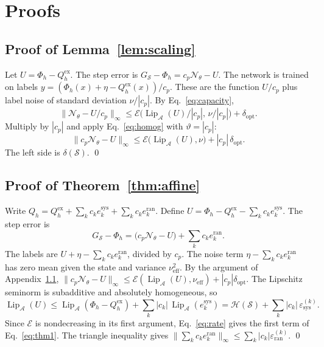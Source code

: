 \documentclass[11pt]{article}
\theoremstyle{definition}
\theoremstyle{remark}
\newcommand{\Aset}{\mathcal{A}}          %
\newcommand{\Net}{\mathcal{N}_\theta}    %
\newcommand{\Meth}{\mathcal{S}}          %
\newcommand{\Hard}{\mathcal{H}}          %
\newcommand{\Err}{\mathcal{E}}           %
\newcommand{\Lip}{\operatorname{Lip}_{\Aset}}
\newcommand{\supA}[1]{\|#1\|_{\infty}}
\newcommand{\sys}{\mathrm{sys}}
\newcommand{\ran}{\mathrm{ran}}
\newcommand{\ex}{\mathrm{ex}}
\begin{document}
\appendix
\section{Proofs}\label{app:proofs}

\subsection{Proof of Lemma~\ref{lem:scaling}}\label{app:scaling}
Let $U = \Phi_h - Q_h^\ex$.
The step error is $G_\Meth - \Phi_h = c_p\Net - U$.
The network is trained on labels $y = (\Phi_h(x) + \eta - Q_h^\ex(x))/c_p$.
These are the function $U/c_p$ plus label noise of standard deviation $\nu/|c_p|$.
By Eq.~\eqref{eq:capacity},
\begin{equation*}
\supA{\Net - U/c_p} \le \Err\big(\Lip(U)/|c_p|,\, \nu/|c_p|\big) + \delta_{\mathrm{opt}}.
\end{equation*}
Multiply by $|c_p|$ and apply Eq.~\eqref{eq:homog} with $\vartheta = |c_p|$:
\begin{equation*}
\supA{c_p\Net - U} \le \Err\big(\Lip(U), \nu\big) + |c_p|\,\delta_{\mathrm{opt}}.
\end{equation*}
The left side is $\delta(\Meth)$. \qed

\subsection{Proof of Theorem~\ref{thm:affine}}\label{app:affine}
Write $Q_h = Q_h^\ex + \sum_k c_k e_k^\sys + \sum_k c_k e_k^\ran$.
Define $U = \Phi_h - Q_h^\ex - \sum_k c_k e_k^\sys$.
The step error is
\begin{equation*}
G_\Meth - \Phi_h = \big(c_p\Net - U\big) + \sum_k c_k e_k^\ran.
\end{equation*}
The labels are $U + \eta - \sum_k c_k e^\ran_k$, divided by $c_p$.
The noise term $\eta - \sum_k c_k e^\ran_k$ has zero mean given the state and variance $\nu_{\mathrm{eff}}^2$.
By the argument of Appendix~\ref{app:scaling}, $\supA{c_p\Net - U} \le \Err(\Lip(U), \nu_{\mathrm{eff}}) + |c_p|\delta_{\mathrm{opt}}$.
The Lipschitz seminorm is subadditive and absolutely homogeneous, so
\begin{equation*}
\Lip(U) \le \Lip(\Phi_h - Q_h^\ex) + \sum_k |c_k|\, \Lip(e_k^\sys) = \Hard(\Meth) + \sum_k |c_k|\,\varepsilon^{(k)}_\sys.
\end{equation*}
Since $\Err$ is nondecreasing in its first argument, Eq.~\eqref{eq:rate} gives the first term of Eq.~\eqref{eq:thm1}.
The triangle inequality gives $\supA{\sum_k c_k e_k^\ran} \le \sum_k |c_k|\varepsilon^{(k)}_\ran$. \qed
\end{document}
